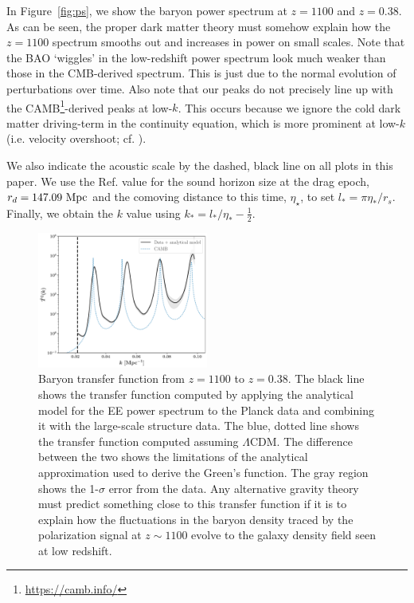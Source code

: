 \documentclass[12pt,floats,floatfix,showpacs,amssymb,amsmath,prl,superscriptaddress,nofootinbib, aps]{revtex4-2}
\begin{document}
In Figure~\ref{fig:ps}, we show the baryon power spectrum at $z=1100$ and $z=0.38$. As can be seen, the proper dark matter theory must somehow explain how the $z=1100$ spectrum smooths out and increases in power on small scales. Note that the BAO `wiggles' in the low-redshift power spectrum look much weaker than those in the CMB-derived spectrum. This is just due to the normal evolution of perturbations over time. Also note that our peaks do not precisely line up with the CAMB\footnote{\url{https://camb.info/}}-derived peaks at low-$k$. This occurs because we ignore the cold dark matter driving-term in the continuity equation, which is more prominent at low-$k$ (i.e. velocity overshoot; cf. \citep{Sunyaev1970b, Press1980, Hu1995}). 


We also indicate the acoustic scale by the dashed, black line on all plots in this paper. We use the Ref. \cite{Planck2018} value for the sound horizon size at the drag epoch, $r_d = 147.09~\rm{Mpc}$ and the comoving distance to this time, $\eta_{\star}$, to set $l_* = \pi \eta_*/r_s$. Finally, we obtain the $k$ value using $k_* = l_*/\eta_* - \frac{1}{2}$. 


\begin{figure}[!htb]
    \centering
    \includegraphics[width=0.5\textwidth]{transfer.pdf}
    \caption{Baryon transfer function from $z=1100$ to $z=0.38$. The black line shows the transfer function computed by applying the analytical model for the EE power spectrum to the Planck data and combining it with the large-scale structure data. The blue, dotted line shows the transfer function computed assuming $\Lambda$CDM.  The difference between the two shows the limitations of the analytical approximation used to derive the Green's function. The gray region shows the 1-$\sigma$ error from the data. Any alternative gravity theory must predict something close to this transfer function if it is to explain how the fluctuations in the baryon density traced by the polarization signal at $z \sim 1100$ evolve to the galaxy density field seen at low redshift.}
    \label{fig:transfer}
\end{figure}
\end{document}
